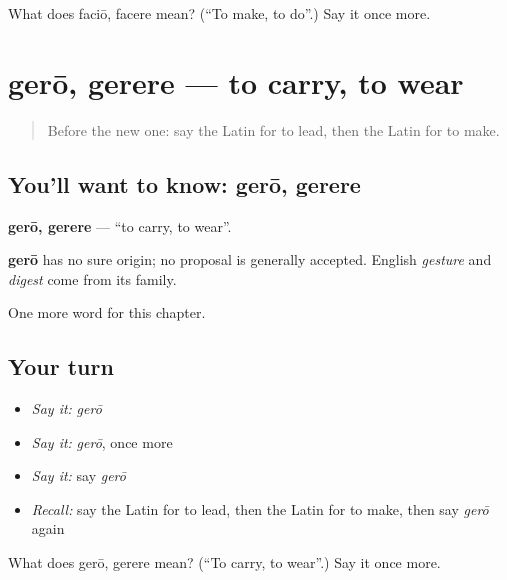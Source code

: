 \begin{tcolorbox}[breakable,colback=teal!4,colframe=teal!35!black,title={Before you move on}]
What does faciō, facere mean? (\textquotedblleft{}To make, to do\textquotedblright{}.) Say it once more.
\end{tcolorbox}
\section[gerō, gerere]{gerō, gerere — to carry, to wear}

\label{lesson:LA-C155-gero}



\begin{quote}
Before the new one: say the Latin for to lead, then the Latin for to make.
\end{quote}

\subsection*{You'll want to know: gerō, gerere}
\textbf{gerō, gerere} — \textquotedblleft{}to carry, to wear\textquotedblright{}.

\begin{cousinweb}
\textbf{gerō} has no sure origin; no proposal is generally accepted. English \emph{gesture} and \emph{digest} come from its family.
\end{cousinweb}

\begin{grammarlens}[title={What you've built}]
One more word for this chapter.
\end{grammarlens}

\subsection*{Your turn}
\begin{itemize}
\raggedright
  \item \emph{Say it:} \emph{gerō}
  \item \emph{Say it:} \emph{gerō}, once more
  \item \emph{Say it:} say \emph{gerō}
  \item \emph{Recall:} say the Latin for to lead, then the Latin for to make, then say \emph{gerō} again
\end{itemize}

\begin{tcolorbox}[breakable,colback=teal!4,colframe=teal!35!black,title={Before you move on}]
What does gerō, gerere mean? (\textquotedblleft{}To carry, to wear\textquotedblright{}.) Say it once more.
\end{tcolorbox}
